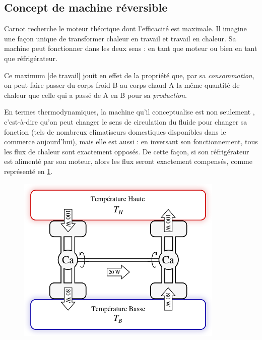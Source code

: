 	\subsection{Concept de machine réversible}
	\label{ch_concept_machine_reversible}

		Carnot recherche le moteur théorique dont l’efficacité est maximale. Il imagine une façon unique de transformer chaleur en travail et travail en chaleur. Sa machine peut fonctionner dans les deux sens : en tant que moteur ou bien en tant que réfrigérateur.

			Ce maximum [de travail] jouit en effet de la propriété que, par sa \emph{consommation}, on peut faire passer du corps froid B au corps chaud A la même quantité de chaleur que celle qui a passé de A en B pour sa \emph{production}.
		
		En termes thermodynamiques, la machine qu’il conceptualise est non seulement , c’est-à-dire qu’on peut changer le sens de circulation du fluide pour changer sa fonction (tels de nombreux climatiseurs domestiques disponibles dans le commerce aujourd’hui), mais elle est aussi  : en inversant son fonctionnement, tous les flux de chaleur sont exactement opposés. De cette façon, si son réfrigérateur est alimenté par son moteur, alors les flux seront exactement compensés, comme représenté en \cref{fig_deux_machines_de_carnot}.

		\begin{figure}
			\begin{center}
				\includegraphics[height=8cm]{images/carnot_moteur_refrigerateur.png}
			\end{center}
			\label{fig_deux_machines_de_carnot}
		\end{figure}

